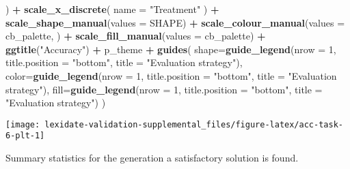 \documentclass[
]{book}
\newenvironment{Shaded}{\begin{snugshade}}{\end{snugshade}}
\newcommand{\AttributeTok}[1]{\textcolor[rgb]{0.13,0.29,0.53}{#1}}
\newcommand{\DecValTok}[1]{\textcolor[rgb]{0.00,0.00,0.81}{#1}}
\newcommand{\FunctionTok}[1]{\textcolor[rgb]{0.13,0.29,0.53}{\textbf{#1}}}
\newcommand{\NormalTok}[1]{#1}
\newcommand{\SpecialCharTok}[1]{\textcolor[rgb]{0.81,0.36,0.00}{\textbf{#1}}}
\newcommand{\StringTok}[1]{\textcolor[rgb]{0.31,0.60,0.02}{#1}}
\begin{document}
\begin{Shaded}
\begin{Highlighting}[]
\NormalTok{  ) }\SpecialCharTok{+}
  \FunctionTok{scale\_x\_discrete}\NormalTok{(}
    \AttributeTok{name =} \StringTok{"Treatment"}
\NormalTok{  ) }\SpecialCharTok{+}
  \FunctionTok{scale\_shape\_manual}\NormalTok{(}\AttributeTok{values =}\NormalTok{ SHAPE) }\SpecialCharTok{+}
  \FunctionTok{scale\_colour\_manual}\NormalTok{(}\AttributeTok{values =}\NormalTok{ cb\_palette, ) }\SpecialCharTok{+}
  \FunctionTok{scale\_fill\_manual}\NormalTok{(}\AttributeTok{values =}\NormalTok{ cb\_palette) }\SpecialCharTok{+}
  \FunctionTok{ggtitle}\NormalTok{(}\StringTok{"Accuracy"}\NormalTok{) }\SpecialCharTok{+}
\NormalTok{  p\_theme }\SpecialCharTok{+}
  \FunctionTok{guides}\NormalTok{(}
    \AttributeTok{shape=}\FunctionTok{guide\_legend}\NormalTok{(}\AttributeTok{nrow =} \DecValTok{1}\NormalTok{, }\AttributeTok{title.position =} \StringTok{"bottom"}\NormalTok{,}
                       \AttributeTok{title =} \StringTok{"Evaluation strategy"}\NormalTok{),}
    \AttributeTok{color=}\FunctionTok{guide\_legend}\NormalTok{(}\AttributeTok{nrow =} \DecValTok{1}\NormalTok{, }\AttributeTok{title.position =} \StringTok{"bottom"}\NormalTok{,}
                       \AttributeTok{title =} \StringTok{"Evaluation strategy"}\NormalTok{),}
    \AttributeTok{fill=}\FunctionTok{guide\_legend}\NormalTok{(}\AttributeTok{nrow =} \DecValTok{1}\NormalTok{, }\AttributeTok{title.position =} \StringTok{"bottom"}\NormalTok{,}
                      \AttributeTok{title =} \StringTok{"Evaluation strategy"}\NormalTok{)}
\NormalTok{  )}
\end{Highlighting}
\end{Shaded}

\texttt{[image: lexidate-validation-supplemental\_files/figure-latex/acc-task-6-plt-1]}

Summary statistics for the generation a satisfactory solution is found.
\end{document}
